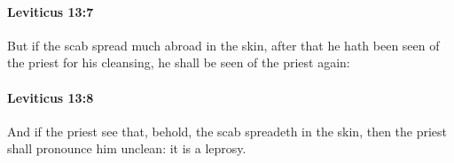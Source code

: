 		\paragraph{Leviticus 13:7} %
			\label{LEVITICUS-13-7}

			But if the scab spread much abroad in the skin, after that he hath been seen of the priest for his cleansing, he shall be seen of the priest again:


		\paragraph{Leviticus 13:8} %
			\label{LEVITICUS-13-8}

			And if the priest see that, behold, the scab spreadeth in the skin, then the priest shall pronounce him unclean: it is a leprosy.


